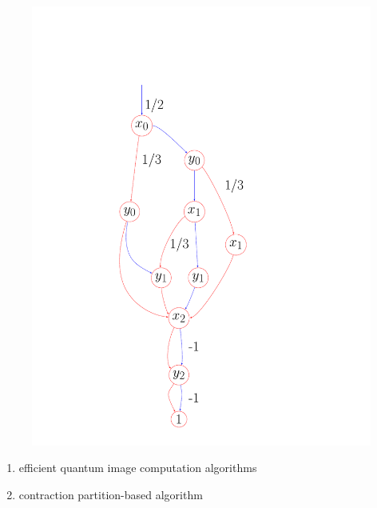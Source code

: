\documentclass[aspectratio=1610,18pt]{ctexbeamer}
\begin{document}
\begin{frame}
  \begin{figure}[tbh]
      \centering
     \quad
     \hfil
      \begin{minipage}{0.5\textwidth}  \includegraphics[width=\textwidth]{Projector.pdf}
      \end{minipage}
    \end{figure}
\end{frame}

\begin{frame}
  \begin{enumerate}
    \Large
    \item efficient quantum image computation algorithms
    \item contraction partition-based algorithm
  \end{enumerate}
\end{frame}
\end{document}
